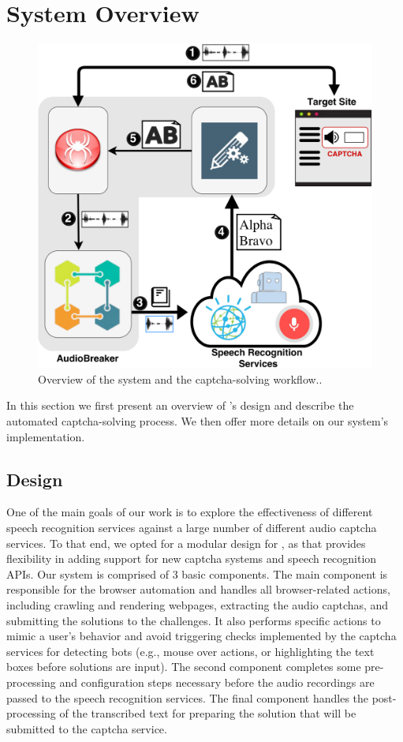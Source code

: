 \section{System Overview}
\label{sec:system}

\begin{figure}
\centering
\includegraphics[width=\columnwidth]{figures/breaker_arch.pdf}
\caption{Overview of the \system system and the captcha-solving workflow..}
\label{fig:breaker}
\end{figure}

In this section we first present an overview of \system's design and describe the automated 
captcha-solving process. We then offer more details on our system's implementation.

\subsection{\system Design}

One of the main goals of our work is to explore the effectiveness of different speech recognition
services against a large number of different audio captcha services. To that end, we opted for 
a modular design for \system, as that provides flexibility in adding support for new captcha 
systems and speech recognition APIs. Our system is comprised of 3 basic components. The main 
component is responsible for the browser automation and handles all browser-related actions,
including crawling and rendering webpages, extracting the audio captchas, and submitting the solutions
to the challenges. It also performs specific actions to mimic a user's behavior and avoid triggering  
checks implemented by the captcha services for detecting bots (e.g., mouse over actions, or highlighting the 
text boxes before solutions are input).
The second component completes some pre-processing and configuration steps 
necessary before the audio recordings are passed to the speech recognition services. The final 
component handles the post-processing of the transcribed text for preparing the solution that will
be submitted to the captcha service.

